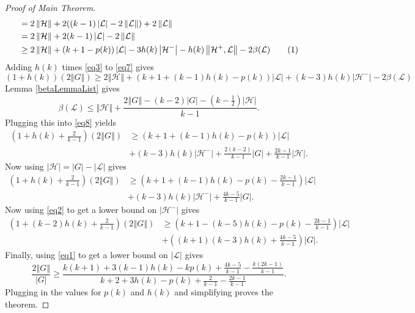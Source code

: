 \documentclass[10pt]{article}
\theoremstyle{plain}
\theoremstyle{definition}
\theoremstyle{remark}
\newcommand{\fancy}[1]{\mathcal{#1}}
\renewcommand{\L}{\fancy{L}}
\newcommand{\HH}{\fancy{H}}
\newcommand{\card}[1]{\left|#1\right|}
\newcommand{\size}[1]{\left\Vert#1\right\Vert}
\newcommand{\parens}[1]{\left( #1 \right)}
\newcommand\numberthis{\addtocounter{equation}{1}\tag{\theequation}}
\begin{document}
\begin{proof}[Proof of Main Theorem]
\begin{align*}
	&= 2\size{\HH} + 2((k-1)\card{\L} - 2\size{\L}) + 2\size{\L}\\
	&= 2\size{\HH} + 2(k-1)\card{\L} - 2\size{\L}\\
	&\ge 2\size{\HH} + \parens{k+1 - p(k)}\card{\L} - 3h(k)\card{\HH^-} - h(k)\size{\HH^+, \L} - 2\beta(\L)\numberthis \label{eq7}\\
\end{align*}
Adding $h(k)$ times \eqref{eq3} to \eqref{eq7} gives
\begin{equation}\label{eq8}
\parens{1 + h(k)}(2\size{G}) \ge 2\size{\HH} + \parens{k+1 +(k-1)h(k)- p(k)}\card{\L} + (k- 3)h(k)\card{\HH^-}  - 2\beta(\L)
\end{equation}
Lemma \ref{betaLemmaList} gives
\[\beta(\L) \le \size{\HH} + \frac{2\size{G} - (k-2)\card{G} - \parens{k - \frac12}\card{\HH}}{k-1}.\]
Plugging this into \eqref{eq8} yields
\begin{equation}\label{eq9}
\begin{align*}
\parens{1 + h(k) + \frac{2}{k-1}}(2\size{G}) &\ge \parens{k+1 +(k-1)h(k)- p(k)}\card{\L}\\ 
&+ (k- 3)h(k)\card{\HH^-} +\frac{2(k-2)}{k-1}\card{G} + \frac{2k-1}{k-1}\card{\HH}.
\end{align*}
\end{equation}
Now using $\card{\HH} = \card{G} - \card{\L}$ gives
\begin{equation}\label{eq10}
\begin{align*}
\parens{1 + h(k) + \frac{2}{k-1}}(2\size{G}) &\ge \parens{k+1 +(k-1)h(k)- p(k) - \frac{2k-1}{k-1}}\card{\L}\\ 
&+ (k- 3)h(k)\card{\HH^-} +\frac{4k-5}{k-1}\card{G}.
\end{align*}
\end{equation}
Now using \eqref{eq2} to get a lower bound on $\card{\HH^-}$ gives
\begin{equation}\label{eq11}
\begin{align*}
\parens{1 + (k-2)h(k) + \frac{2}{k-1}}(2\size{G}) &\ge \parens{k+1 - (k-5)h(k)- p(k) - \frac{2k-1}{k-1}}\card{\L}\\ 
&+\parens{(k+1)(k-3)h(k) + \frac{4k-5}{k-1}}\card{G}.
\end{align*}
\end{equation}
Finally, using \eqref{eq1} to get a lower bound on $\card{\L}$ gives
\begin{equation}\label{eq12}
\frac{2\size{G}}{\card{G}} \ge \frac{k(k+1) + 3(k-1)h(k) - kp(k) + \frac{4k-5}{k-1} - \frac{k(2k-1)}{k-1}}{k+2 + 3h(k) - p(k) + \frac{2}{k-1}- \frac{2k-1}{k-1}}.
\end{equation}
Plugging in the values for $p(k)$ and $h(k)$ and simplifying proves the theorem.
\end{proof}
\end{document}

